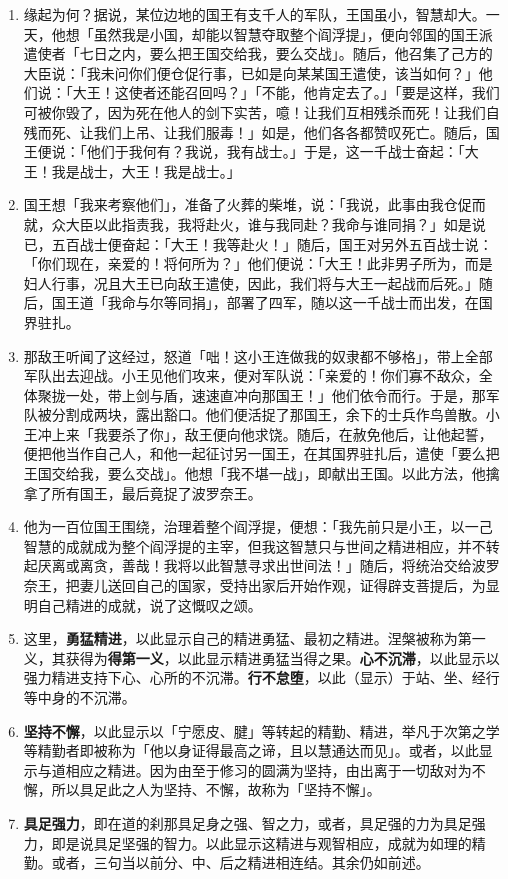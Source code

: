 \begin{enumerate}\item 缘起为何？据说，某位边地的国王有支千人的军队，王国虽小，智慧却大。一天，他想「虽然我是小国，却能以智慧夺取整个阎浮提」，便向邻国的国王派遣使者「七日之内，要么把王国交给我，要么交战」。随后，他召集了己方的大臣说：「我未问你们便仓促行事，已如是向某某国王遣使，该当如何？」他们说：「大王！这使者还能召回吗？」「不能，他肯定去了。」「要是这样，我们可被你毁了，因为死在他人的剑下实苦，噫！让我们互相残杀而死！让我们自残而死、让我们上吊、让我们服毒！」如是，他们各各都赞叹死亡。随后，国王便说：「他们于我何有？我说，我有战士。」于是，这一千战士奋起：「大王！我是战士，大王！我是战士。」
\item 国王想「我来考察他们」，准备了火葬的柴堆，说：「我说，此事由我仓促而就，众大臣以此指责我，我将赴火，谁与我同赴？我命与谁同捐？」如是说已，五百战士便奋起：「大王！我等赴火！」随后，国王对另外五百战士说：「你们现在，亲爱的！将何所为？」他们便说：「大王！此非男子所为，而是妇人行事，况且大王已向敌王遣使，因此，我们将与大王一起战而后死。」随后，国王道「我命与尔等同捐」，部署了四军，随以这一千战士而出发，在国界驻扎。
\item 那敌王听闻了这经过，怒道「咄！这小王连做我的奴隶都不够格」，带上全部军队出去迎战。小王见他们攻来，便对军队说：「亲爱的！你们寡不敌众，全体聚拢一处，带上剑与盾，速速直冲向那国王！」他们依令而行。于是，那军队被分割成两块，露出豁口。他们便活捉了那国王，余下的士兵作鸟兽散。小王冲上来「我要杀了你」，敌王便向他求饶。随后，在赦免他后，让他起誓，便把他当作自己人，和他一起征讨另一国王，在其国界驻扎后，遣使「要么把王国交给我，要么交战」。他想「我不堪一战」，即献出王国。以此方法，他擒拿了所有国王，最后竟捉了波罗奈王。
\item 他为一百位国王围绕，治理着整个阎浮提，便想：「我先前只是小王，以一己智慧的成就成为整个阎浮提的主宰，但我这智慧只与世间之精进相应，并不转起厌离或离贪，善哉！我将以此智慧寻求出世间法！」随后，将统治交给波罗奈王，把妻儿送回自己的国家，受持出家后开始作观，证得辟支菩提后，为显明自己精进的成就，说了这慨叹之颂。
\item 这里，\textbf{勇猛精进}，以此显示自己的精进勇猛、最初之精进。涅槃被称为第一义，其获得为\textbf{得第一义}，以此显示精进勇猛当得之果。\textbf{心不沉滞}，以此显示以强力精进支持下心、心所的不沉滞。\textbf{行不怠堕}，以此（显示）于站、坐、经行等中身的不沉滞。
\item \textbf{坚持不懈}，以此显示以「宁愿皮、腱」等转起的精勤、精进，举凡于次第之学等精勤者即被称为「他以身证得最高之谛，且以慧通达而见」。或者，以此显示与道相应之精进。因为由至于修习的圆满为坚持，由出离于一切敌对为不懈，所以具足此之人为坚持、不懈，故称为「坚持不懈」。
\item \textbf{具足强力}，即在道的刹那具足身之强、智之力，或者，具足强的力为具足强力，即是说具足坚强的智力。以此显示这精进与观智相应，成就为如理的精勤。或者，三句当以前分、中、后之精进相连结。其余仍如前述。\end{enumerate}

